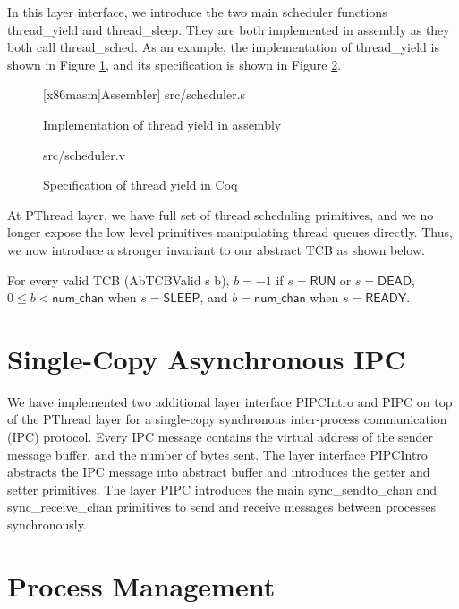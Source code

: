 In this layer interface, we introduce the two main scheduler functions \textsf{thread\_yield} and
\textsf{thread\_sleep}. They are both implemented in assembly as they both call \textsf{thread\_sched}.
As an example, the implementation of \textsf{thread\_yield} is shown in Figure \ref{fig:scheduler_s}, and
its specification is shown in Figure \ref{fig:scheduler_v}.

\begin{figure}
	{[x86masm]Assembler}] {src/scheduler.s}
	\caption{Implementation of thread yield in assembly}
	\label{fig:scheduler_s}
\end{figure}

\begin{figure}
	 {src/scheduler.v}
	\caption{Specification of thread yield in Coq}
	\label{fig:scheduler_v}
\end{figure}

At PThread layer, we have full set of thread scheduling primitives, and we no longer expose the low
level primitives manipulating thread queues directly. Thus, we now introduce a stronger invariant
to our abstract TCB as shown below.

\begin{invariant}
For every valid TCB (\textsf{AbTCBValid s b}), $b=-1$ if $s=\textsf{RUN}$ or $s=\textsf{DEAD}$,
$0\le b < \textsf{num\_chan}$ when $s=\textsf{SLEEP}$, and $b=\textsf{num\_chan}$ when $s=\textsf{READY}$.
\end{invariant}


\section{Single-Copy Asynchronous IPC}

We have implemented two additional layer interface PIPCIntro and PIPC on top of the PThread layer for a single-copy
synchronous inter-process communication (IPC) protocol. 
Every IPC message contains the virtual address of the sender message buffer, and the number of bytes sent.
The layer interface PIPCIntro abstracts the IPC message into abstract buffer and introduces the getter and setter primitives.
The layer PIPC introduces the main \textsf{sync\_sendto\_chan} and \textsf{sync\_receive\_chan} primitives to send and receive
messages between processes synchronously. 

\section{Process Management}

